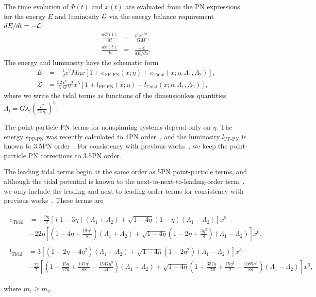 \documentclass[twocolumn,prd,amssymb,aps,nofootinbib,showpacs,epsf]{revtex4}
\begin{document}
The time evolution of $\Phi(t)$ and $x(t)$ are evaluated from the PN expressions for the energy $E$ and luminosity ${\cal L}$ via the energy balance requirement $dE/dt=-{\cal L}$:
\begin{eqnarray}
\label{eq:dPhidt}
\frac{d\Phi(t)}{dt}&=&\frac{c^3 x^{3/2}}{G M},\\
\label{eq:dxdt}
\frac{d x(t)}{dt}&=&\frac{-\mathcal{L}}{dE/dx}.
\end{eqnarray}
The energy and luminosity have the schematic form
\begin{align}
E &= - \frac{1}{2} c^2 M \eta x \left[1 + e_\text{PP-PN}(x; \eta) + e_\text{Tidal}(x; \eta, \Lambda_1, \Lambda_2)\right], \\
\mathcal{L} &= \frac{32}{5} \frac{c^5}{G} \eta^2 x^5 \left[ 1 + l_\text{PP-PN}(x; \eta) + l_\text{Tidal}(x; \eta, \Lambda_1, \Lambda_2)\right],
\end{align}
where we write the tidal terms as functions of the dimensionless quantities $\Lambda_i = G\lambda_i \left(\frac{c^2}{G m_i}\right)^5$.

The point-particle PN terms for nonspinning systems depend only on $\eta$. The energy $e_\text{PP-PN}$ was recently calculated to 4PN order~\cite{BiniDamour2013, FoffaSturani2014}, and the luminosity $l_\text{PP-PN}$ is known to 3.5PN order~\cite{Blanchet2014Review}. For consistency with previous works~\cite{WadeCreightonOchsner2014, DelPozzoLiAgathos2013, Favata2014, YagiYunes2014}, we keep the point-particle PN corrections to 3.5PN order.

The leading tidal terms begin at the same order as 5PN point-particle terms, and although the tidal potential is known to the next-to-next-to-leading-order term~\cite{BiniDamourFaye2012}, we only include the leading and next-to-leading order terms for consistency with previous works~\cite{WadeCreightonOchsner2014, DelPozzoLiAgathos2013, Favata2014, YagiYunes2014}. These terms are~\cite{VinesFlanaganHinderer2011}
\begin{widetext}
\begin{align}
\begin{split}
e_\text{Tidal} &= -\frac{9\eta}{2} \left[ (1-3\eta)(\Lambda_1+\Lambda_2) + \sqrt{1-4\eta}(1-\eta)(\Lambda_1-\Lambda_2) \right]x^5 \\
& - 22\eta \left[ \left(1-4\eta+\frac{19\eta^2}{8}\right)(\Lambda_1+\Lambda_2) + \sqrt{1-4\eta}\left(1-2\eta+\frac{3\eta^2}{8}\right)(\Lambda_1-\Lambda_2) \right]x^6,
\end{split} \\
\begin{split}
l_\text{Tidal} &= 3 \left[ (1-2\eta-4\eta^2)(\Lambda_1+\Lambda_2) + \sqrt{1-4\eta}(1-2\eta^2)(\Lambda_1-\Lambda_2) \right]x^5 \\
& - \frac{22}{7} \left[ \left(1-\frac{15\eta}{176}+\frac{147\eta^2}{88}-\frac{1547\eta^3}{44}\right)(\Lambda_1+\Lambda_2) + \sqrt{1-4\eta}\left(1+\frac{337\eta}{176}+\frac{15\eta^2}{2}-\frac{1085\eta^3}{88}\right)(\Lambda_1-\Lambda_2) \right]x^6,
\end{split}
\end{align}
\end{widetext}
where $m_1 \ge m_2$.
\end{document}
